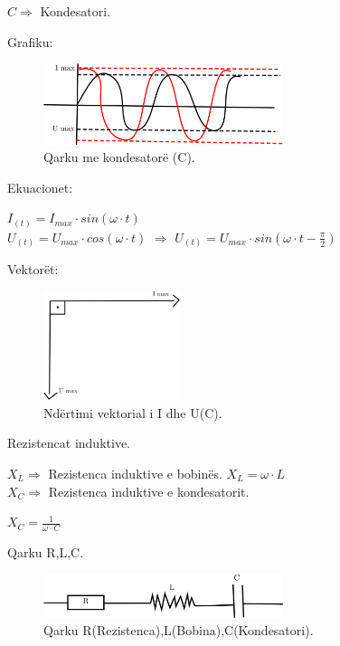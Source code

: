 \documentclass[twocolumn]{article}
\begin{document}
	
	$C \Rightarrow $ Kondesatori.
	
	\begin{center}
		Grafiku:
	\end{center}
	\begin{figure}[h]
		\includegraphics[width=70mm]{Imazhet/Grafik C.png}
		\caption{Qarku me kondesatorë (C).}
		\label{fig:boat1}
	\end{figure}
	
	\begin{center}
		Ekuacionet:
	\end{center}
	
	$I_{(t)}= I_{max} \cdot sin (\omega \cdot t)$\\
	
	
	$U_{(t)}= U_{max} \cdot cos (\omega \cdot t)$ $\Rightarrow$ $U_{(t)}= U_{max} \cdot sin (\omega \cdot t - \frac{\pi}{2})$
	
	\begin{center}
		Vektorët:
	\end{center}
	
	\begin{figure}[h]
		\includegraphics[width=40mm]{Imazhet/Vektor C.png}
		\caption{Ndërtimi vektorial i I  dhe U(C).}
		\label{fig:boat1}
	\end{figure}
	
	\begin{center}
		Rezistencat induktive.
	\end{center}
	
	$X_{L} \Rightarrow $ Rezistenca induktive e bobinës. $X_{L}=\omega \cdot L$\\
	
	
	
	$X_{C} \Rightarrow $ Rezistenca induktive e kondesatorit.
	
	$X_{C}=\frac{1}{\omega \cdot C}$\\
	
	
	\begin{center}
		Qarku R,L,C.
	\end{center}
	\begin{figure}[h]
		\includegraphics[width=70mm]{Imazhet/Qarku R,L,C.png}
		\caption{	Qarku R(Rezistenca),L(Bobina),C(Kondesatori).}
		\label{fig:boat1}
	\end{figure}
	
\end{document}
